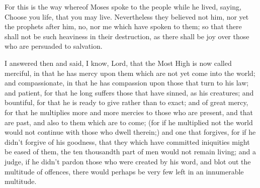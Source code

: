 {For this is the way whereof Moses spoke to the people while he lived, saying, Choose you life, that you may live.
Nevertheless they believed not him, nor yet the prophets after him, no, nor me which have spoken to them;
so that there shall not be such heaviness in their destruction, as there shall be joy over those who are persuaded to salvation.
\par }{\PP {}I answered then and said, I know, Lord, that the Most High is now called merciful, in that he has mercy upon them which are not yet come into the world;
and compassionate, in that he has compassion upon those that turn to his law;
and patient, for that he long suffers those that have sinned, as his creatures;
and bountiful, for that he is ready to give rather than to exact;
and of great mercy, for that he multiplies more and more mercies to those who are present, and that are past, and also to them which are to come;
(for if he multiplied not
{} the world would not continue with those who dwell therein;)
and one that forgives, for if he didn’t forgive of his goodness, that they which have committed iniquities might be eased of them, the ten thousandth part of men would not remain living;
and a judge,
{} if he didn’t pardon those who were created by his word, and blot out the multitude of
 offences,
there would perhaps be very few left in an innumerable multitude.

}
